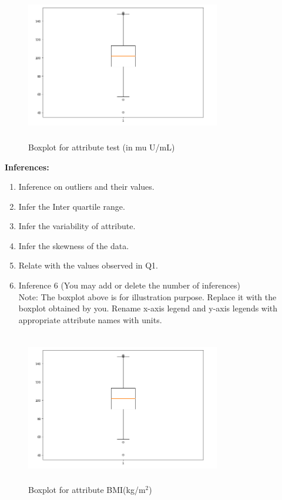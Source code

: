 \documentclass[12 pt, a4paper]{article}
\theoremstyle{definition}
\begin{document}
\begin{figure}[H]
	\centering
	\includegraphics[width=8.5cm,height=6.65cm]{boxplot.png}
	\caption{Boxplot for attribute test (in mu U/mL)}
	\label{Blockdia}
\end{figure}

\textbf{\Large Inferences:}
\begin{enumerate}
   \item Inference on outliers and their values.
   \item Infer the Inter quartile range.
   \item Infer the variability of attribute.
   \item Infer the skewness of the data.
 \item Relate with the values observed in Q1. \item Inference 6 (You may add or delete the number of inferences)
\\Note: The boxplot above is for illustration purpose. Replace it with the boxplot obtained by you. Rename x-axis legend and y-axis legends with appropriate attribute names with units.

\end{enumerate}

\begin{figure}[H]
	\centering
	\includegraphics[width=8.5cm,height=6.65cm]{boxplot.png}
	\caption{Boxplot for attribute BMI(kg/m$^{2}$)}
	\label{Blockdia}
\end{figure}
\end{document}
